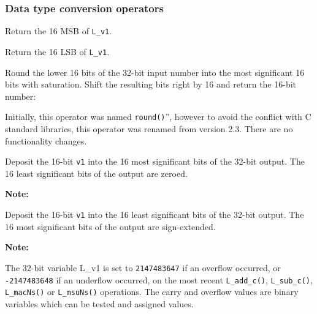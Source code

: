 \subsubsection{Data type conversion operators}


Return the 16 MSB of {\tt L\_v1}.


Return the 16 LSB of {\tt L\_v1}.


Round the lower 16 bits of the 32-bit input number into the most
significant 16 bits with saturation. Shift the resulting bits
right by 16 and return the 16-bit number:


Initially, this operator was named {\tt round()}'', however to avoid
the conflict with C standard libraries, this operator was renamed from
version 2.3. There are no functionality changes.


Deposit the 16-bit {\tt v1} into the 16 most significant bits
of the 32-bit output. The 16 least significant bits of the output
are zeroed.

\textbf{Note:} \hfill {}


Deposit the 16-bit {\tt v1} into the 16 least significant bits
of the 32-bit output. The 16 most significant bits of the output
are sign-extended.

\textbf{Note:} \hfill {}



The 32-bit variable L\_v1 is set to {\tt 2147483647} if an overflow
occurred, or {\tt -2147483648} if an underflow occurred, on the
most recent {\tt L\_add\_c()}, {\tt L\_sub\_c()}, {\tt L\_macNs()}
or {\tt L\_msuNs()} operations. The carry and overflow values are
binary variables which can be tested and assigned values.

